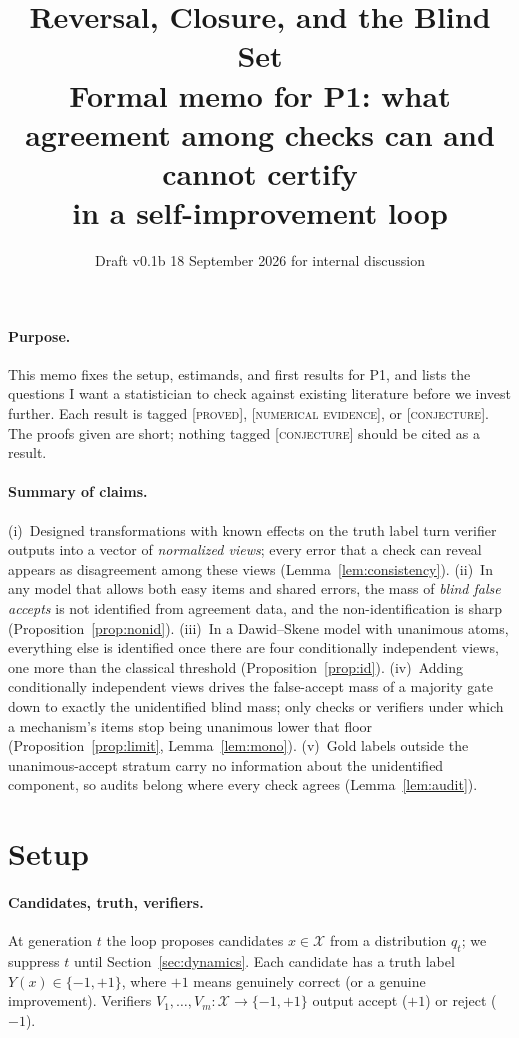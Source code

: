 \documentclass[11pt]{article}
\title{\textbf{Reversal, Closure, and the Blind Set}\\[2pt]
\large Formal memo for P1: what agreement among checks can and cannot certify\\ in a self-improvement loop}
\author{Draft v0.1b \textperiodcentered{} 18 September 2026 \textperiodcentered{} for internal discussion}
\date{}
\theoremstyle{definition}
\theoremstyle{remark}
\begin{document}
\maketitle
\vspace{-2.5em}

\paragraph{Purpose.} This memo fixes the setup, estimands, and first results for P1, and lists the questions I want a statistician to check against existing literature before we invest further. Each result is tagged \textsc{[proved]}, \textsc{[numerical evidence]}, or \textsc{[conjecture]}. The proofs given are short; nothing tagged \textsc{[conjecture]} should be cited as a result.

\paragraph{Summary of claims.}
(i)~Designed transformations with known effects on the truth label turn verifier outputs into a vector of \emph{normalized views}; every error that a check can reveal appears as disagreement among these views (Lemma~\ref{lem:consistency}).
(ii)~In any model that allows both easy items and shared errors, the mass of \emph{blind false accepts} is not identified from agreement data, and the non-identification is sharp (Proposition~\ref{prop:nonid}).
(iii)~In a Dawid--Skene model with unanimous atoms, everything else is identified once there are four conditionally independent views, one more than the classical threshold (Proposition~\ref{prop:id}).
(iv)~Adding conditionally independent views drives the false-accept mass of a majority gate down to exactly the unidentified blind mass; only checks or verifiers under which a mechanism's items stop being unanimous lower that floor (Proposition~\ref{prop:limit}, Lemma~\ref{lem:mono}).
(v)~Gold labels outside the unanimous-accept stratum carry no information about the unidentified component, so audits belong where every check agrees (Lemma~\ref{lem:audit}).

\section{Setup}

\paragraph{Candidates, truth, verifiers.} At generation $t$ the loop proposes candidates $x\in\mathcal{X}$ from a distribution $q_t$; we suppress $t$ until Section~\ref{sec:dynamics}. Each candidate has a truth label $Y(x)\in\{-1,+1\}$, where $+1$ means genuinely correct (or a genuine improvement). Verifiers $V_1,\dots,V_m:\mathcal{X}\to\{-1,+1\}$ output accept ($+1$) or reject ($-1$).
\end{document}
